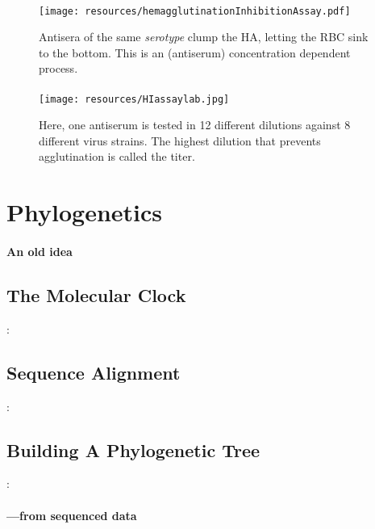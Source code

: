 \documentclass{beamer}
\begin{document}
\begin{darkframes}
    \begin{frame}{\subsecname}
      \framesubtitle{}
      \begin{figure}
        \texttt{[image: resources/hemagglutinationInhibitionAssay.pdf]}
        \caption{Antisera of the same \textit{serotype} clump the HA, letting the RBC sink to the bottom. This is an (antiserum) concentration dependent process.}
      \end{figure}
    \end{frame}

    \begin{frame}{\subsecname}
      \framesubtitle{}
      \begin{figure}
        \texttt{[image: resources/HIassaylab.jpg]}
        \caption{\footnotesize Here, one antiserum is tested in 12 different dilutions against 8 different virus strains. The highest dilution that prevents agglutination is called the titer.}
      \end{figure}
    \end{frame}






  \section{Phylogenetics}

    \begin{frame}{\secname}
      \framesubtitle{An old idea}
    \end{frame}

    \subsection{The Molecular Clock}
    \begin{frame}{\secname : \subsecname}
      \framesubtitle{}
    \end{frame}

    \subsection{Sequence Alignment}
    \begin{frame}{\secname : \subsecname}
      \framesubtitle{}
    \end{frame}

    \subsection{Building A Phylogenetic Tree}
    \begin{frame}{\secname : \subsecname}
      \framesubtitle{---from sequenced data}
    \end{frame}


\end{darkframes}
\end{document}

